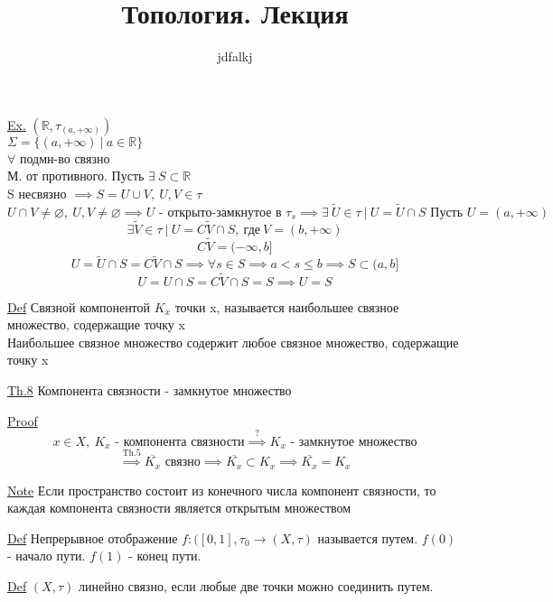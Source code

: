 \documentclass[a4paper]{article}
\begin{document}
\title{Топология. Лекция}
\author{jdfalkj}
\maketitle

\underline{Ex.} $ (\mathbb{R}, \tau_{(a, + \infty)}) $ \\
$ \Sigma = \{ (a, +\infty) \ |\ a \in \mathbb{R} \} $ \\
$ \forall $ подмн-во связно\\
М. от противного. Пусть $ \exists \ S \subset \mathbb{R} $ \\
S несвязно $ \implies S = U \cup V, \ U,V \in \tau $ 
\[
    U \cap V \neq \varnothing, \ U,V \neq \varnothing \implies
    U \text{ - открыто-замкнутое в } \tau_s \implies \exists \ \tilde{U} \in \tau
    \ | \ U = \tilde{U} \cap S \text{ Пусть } U = (a, +\infty)
\]
\[
    \exists \tilde{V} \in \tau \ | \ U = C\tilde{V} \cap S, \ \text{где}\ V =
    (b, +\infty)
\]
\[
    C \tilde{V} = (-\infty, b]
\]
\[
    U = \tilde{U} \cap S = C \tilde{V} \cap S \implies \forall s \in S \implies
    a < s \leq b \implies S \subset (a, b]
\]
\[
    U = U \cap S = C \tilde{V} \cap S = S \implies U = S
\]

\underline{Def} Связной компонентой $ K_x $ точки x, называется наибольшее связное
множество, содержащие точку x\\
Наибольшее связное множество содержит любое связное множество, содержащие точку x

\begin{tcolorbox}
\underline{Th.8} Компонента связности - замкнутое множество

\underline{Proof}
\[
    x \in X, \ K_x \text{ - компонента связности} \stackrel{?}{\implies}
    K_x \text{ - замкнутое множество}
\]
\[
    \stackrel{\text{Th.5}}{\implies} \overline{K_x} \text{ связно} \implies
    \overline{K_x} \subset K_x \implies \overline{K_x} = K_x
\]

\underline{Note} Если пространство состоит из конечного числа компонент связности,
то каждая компонента связности является открытым множеством
\end{tcolorbox}

\underline{Def} Непрерывное отображение $ f: ([0,1], \tau_0 \to (X,\tau) $ называется
путем. $ f(0) $ - начало пути. $ f(1) $ - конец пути.

\underline{Def} $ (X, \tau) $ линейно связно, если любые две точки можно соединить
путем.
\end{document}
